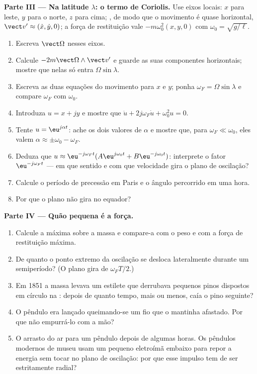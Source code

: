 \begin{problem}
\medskip
\noindent\textbf{Parte III --- Na latitude $\lambda$: o termo de Coriolis.}
Use eixos locais: $x$ para leste, $y$ para o norte, $z$ para cima; , de modo que o movimento é quase horizontal, $\vect v' \approx (\dot x, \dot y, 0)$; a
força de restituição vale $-m\omega_0^2(x, y, 0)$ com $\omega_0 = \sqrt{g/\ell}$.
\begin{enumerate}[resume]
  \item Escreva $\vect\Omega$ nesses eixos.
  \item Calcule $-2m\vect\Omega\wedge\vect v'$ e guarde as suas componentes
        horizontais; mostre que nelas só entra $\Omega\sin\lambda$.
  \item Escreva as duas equações do movimento para $x$ e $y$; ponha
        $\omega_F = \Omega\sin\lambda$ e compare $\omega_F$ com $\omega_0$.
  \item Introduza $u = x + jy$ e mostre que $\ddot u + 2j\omega_F\dot u +
        \omega_0^2u = 0$.
  \item Tente $u = \eu^{j\alpha t}$: ache os dois valores de $\alpha$ e
        mostre que, para $\omega_F \ll \omega_0$, eles valem $\alpha \approx \pm\omega_0
        - \omega_F$.
  \item Deduza que $u \approx \eu^{-j\omega_Ft}(A\eu^{j\omega_0t} + B\eu^{-j\omega_0t})$:
        interprete o fator $\eu^{-j\omega_Ft}$ --- em que sentido e com que
        velocidade gira o plano de oscilação?
  \item Calcule o período de precessão em Paris e o ângulo percorrido em
        uma hora.
  \item Por que o plano não gira no equador?
\end{enumerate}

\medskip
\noindent\textbf{Parte IV --- Quão pequena é a força.}
\begin{enumerate}[resume]
  \item Calcule a  máxima sobre a massa e compare-a com o
        peso e com a força de restituição máxima.
  \item De quanto o ponto extremo da oscilação se desloca lateralmente
        durante um semiperíodo? (O plano gira de $\omega_FT/2$.)
  \item Em 1851 a massa levava um estilete que derrubava pequenos pinos
        dispostos em círculo na : depois de quanto tempo, mais ou
        menos, caía o pino seguinte?
  \item O pêndulo era lançado queimando-se um fio que o mantinha afastado.
        Por que não empurrá-lo com a mão?
  \item O arrasto do ar para um pêndulo depois de algumas horas. Os
        pêndulos modernos de museu usam um pequeno eletroímã embaixo para
        repor a energia sem tocar no plano de oscilação: por que esse
        impulso tem de ser estritamente radial?
\end{enumerate}


\end{problem}
